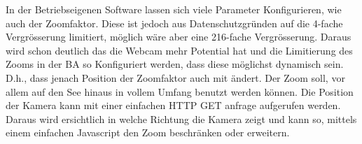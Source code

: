 In der Betriebseigenen Software lassen sich viele Parameter Konfigurieren, wie auch der Zoomfaktor. Diese ist jedoch aus Datenschutzgründen auf die 4-fache Vergrösserung limitiert, möglich wäre aber eine 216-fache Vergrösserung. Daraus wird schon deutlich das die Webcam mehr Potential hat und die Limitierung des Zooms in der BA so Konfiguriert werden, dass diese möglichst dynamisch sein. D.h., dass jenach Position der Zoomfaktor auch mit ändert. Der Zoom soll, vor allem auf den See hinaus in vollem Umfang benutzt werden können. Die Position der Kamera kann mit einer einfachen HTTP GET anfrage aufgerufen werden. Daraus wird ersichtlich in welche Richtung die Kamera zeigt und kann so, mittels einem einfachen Javascript den Zoom beschränken oder erweitern.